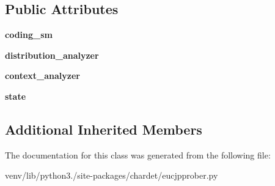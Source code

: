 \subsection*{Public Attributes}
\begin{DoxyCompactItemize}
\item 
\mbox{\label{classchardet_1_1eucjpprober_1_1_e_u_c_j_p_prober_a7c1cdf95a62a1bf894c5c8470d4aeaec}} 
{\bfseries coding\+\_\+sm}
\item 
\mbox{\label{classchardet_1_1eucjpprober_1_1_e_u_c_j_p_prober_adf62be1f3c3f1beaf533876ee19f7b53}} 
{\bfseries distribution\+\_\+analyzer}
\item 
\mbox{\label{classchardet_1_1eucjpprober_1_1_e_u_c_j_p_prober_ac83ebd1ba8af3416ec2feef150a6f53b}} 
{\bfseries context\+\_\+analyzer}
\item 
\mbox{\label{classchardet_1_1eucjpprober_1_1_e_u_c_j_p_prober_aa0f80b37db3ca764913da65d226007a9}} 
{\bfseries state}
\end{DoxyCompactItemize}
\subsection*{Additional Inherited Members}


The documentation for this class was generated from the following file\+:\begin{DoxyCompactItemize}
\item 
venv/lib/python3./site-\/packages/chardet/eucjpprober.\+py\end{DoxyCompactItemize}
